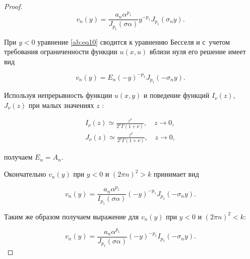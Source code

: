 \begin{proof}
\begin{equation}

\label{ab:eq53}

v_n(y)=\frac{a_n\alpha^{p_1}}{J_{p_1}(\sigma\alpha)}y^{-p_1}J_{p_1}(\sigma_ny).

\end{equation}



При $y<0$  уравнение \eqref{ab:eq10} сводится к уравнению Бесселя и с~учетом требования ограниченности функции $u(x,u)$ вблизи нуля его решение имеет вид

\begin{equation}

\label{ab:eq54}

v_n(y)=E_n(-y)^{-p_1}J_{p_1}(-\sigma_n y).

\end{equation}

  

Используя непрерывность функции $u(x,y)$ и поведение функций $I_{\nu}(z)$, $J_{\nu}(z)$ при малых значениях $z$ \cite[c.~172, 173]{ab:bib:Lebedev}:

\begin{gather}

\label{ab:eq44}

I_{\nu}(z)\simeq\frac{z^{\nu}}{2^{\nu}\Gamma(1+\nu)},\quad z\to0,

\\

\label{ab:eq45}J_{\nu}(z)\simeq\frac{z^{\nu}}{2^{\nu}\Gamma(1+\nu)},\quad z\to0,

\end{gather}

 получаем $E_n=A_n$.



Окончательно $v_n(y)$ при $y<0$ и $(2\pi n)^2>k$ принимает вид

\begin{equation}

\label{ab:eq14}

v_n(y)=\frac{a_n\alpha^{p_1}}{I_{p_1}(\sigma\alpha)}(-y)^{-p_1}J_{p_1}(-\sigma_ny).

\end{equation}



Таким же образом получаем выражение для $v_n(y)$ при $y<0$ и $(2\pi n)^2<k$:

\begin{equation}\label{ab:eq61}

v_n(y)=\frac{a_n\alpha^{p_1}}{J_{p_1}(\sigma\alpha)}(-y)^{-p_1}I_{p_1}(-\sigma_ny).


\end{equation}
\end{proof}
